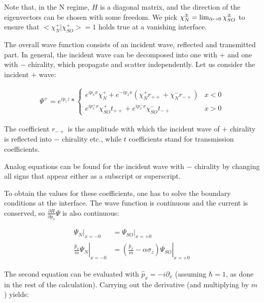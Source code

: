 Note that, in the N regime, $H$ is a diagonal matrix, and the direction
of the eigenvectors can be chosen with some freedom. We pick
$\chi_N^{\pm} = \lim_{\tilde \alpha \mapsto 0} \chi_{SO}^{\pm}$ to ensure that
$<\chi_N^+|\chi_{SO}^+> = 1$ holds true at a vanishing interface.



The overall wave function consists of an incident wave, 
reflected and transmitted part. In general, the incident wave can
be decomposed into one with $+$ and one with $-$ chirality, which
propagate and scatter independently. Let us consider the incident $+$
wave:

\begin{align}
    \Psi^+ = e^{i p_z z} * \left\{
        \begin{array}{ll}
            e^{i p_x x} \chi_N^+ + e^{- i p_x x} (\chi_N^+ r_{++} +
                    \chi_N^- r_{-+})    & x < 0\\
            e^{i p_x^+ x} \chi_{SO}^+ t_{++} + e^{i p_x^- x}
            \chi_{SO}^- t_{-+}          & x > 0
        \end{array} \right.
        \label{eq:chiral-wafe-function}
\end{align}

The coefficient $r_{-+}$ is the amplitude with which the incident wave
of $+$ chirality is reflected into $-$ chirality etc., while $t$
coefficients stand for transmission coefficients.

Analog equations can be found for the incident wave with $-$ chirality
by changing all signs that appear either as a subscript or
superscript.

To obtain the values for these coefficients, one has to solve the
boundary conditions at the interface. The wave function is continuous
and the current is conserved, so $\frac{\partial H}{\partial p_x} \Psi$ is also
continuous:

\begin{align}
    \Psi_N|_{x = -0}    &= \Psi_{SO}|_{x = +0} \label{eq:continuous}\\
    \left.\frac{\hat p_x}{m} \Psi_N\right|_{x = -0}
                        &= \left. \left(\frac{\hat p_x}{m} -\alpha \sigma_z\right)
                                \Psi_{SO}\right|_{x = +0}
\end{align}

The second equation can be evaluated with $\hat p_x = -i \partial_x$
(assuming $\hbar = 1$, as done in the rest of the calculation).
Carrying out the derivative (and multiplying by $m$) yields:

